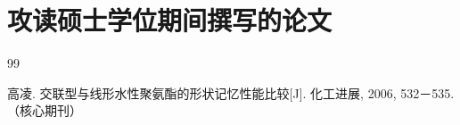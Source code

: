 \chapter{攻读硕士学位期间撰写的论文}

\begin{publications}{99}

    \item\textsc{高凌}. {交联型与线形水性聚氨酯的形状记忆性能比较}[J].
      化工进展, 2006, 532－535.（核心期刊）

\end{publications}